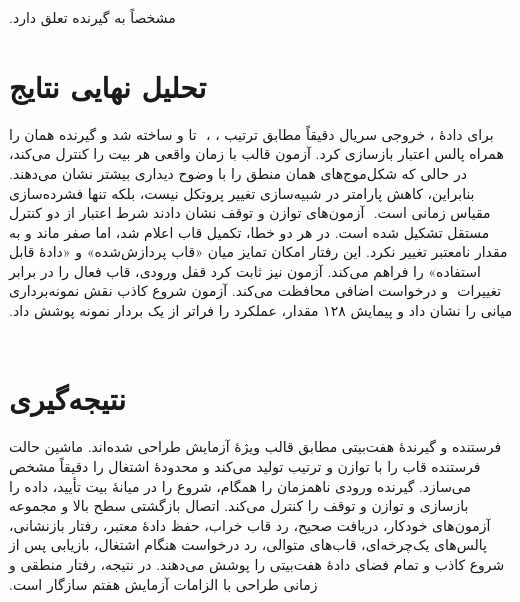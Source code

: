 ‫مشخصاً به گیرنده تعلق دارد.
‫
‫
‫\section{تحلیل نهایی نتایج}
‫
‫برای دادهٔ ، خروجی سریال دقیقاً مطابق ترتیب ، ،
‫ تا  و  ساخته شد و گیرنده همان  را همراه پالس
‫اعتبار بازسازی کرد. آزمون قالب با  زمان واقعی هر بیت را کنترل می‌کند،
‫در حالی که شکل‌موج‌های  همان منطق را با وضوح دیداری بیشتر نشان
‫می‌دهند. بنابراین، کاهش پارامتر در شبیه‌سازی تغییر پروتکل نیست، بلکه تنها فشرده‌سازی مقیاس
‫زمانی است.
‫
‫آزمون‌های توازن و توقف نشان دادند شرط اعتبار از دو کنترل مستقل تشکیل شده است. در هر دو
‫خطا، تکمیل قاب اعلام شد، اما  صفر ماند و  به مقدار
‫نامعتبر تغییر نکرد. این رفتار امکان تمایز میان «قاب پردازش‌شده» و «دادهٔ قابل استفاده» را
‫فراهم می‌کند. آزمون  نیز ثابت کرد قفل ورودی، قاب فعال را در برابر تغییرات
‫ و درخواست اضافی محافظت می‌کند. آزمون شروع کاذب نقش نمونه‌برداری میانی را
‫نشان داد و پیمایش ۱۲۸ مقدار، عملکرد را فراتر از یک بردار نمونه پوشش داد.
‫
‫
‫\section{نتیجه‌گیری}
‫
‫فرستنده و گیرندهٔ  هفت‌بیتی مطابق قالب ویژهٔ آزمایش طراحی شده‌اند. ماشین حالت
‫فرستنده قاب را با توازن  و ترتیب  تولید می‌کند و 
‫محدودهٔ اشتغال را دقیقاً مشخص می‌سازد. گیرنده ورودی ناهمزمان را همگام، شروع را در میانهٔ
‫بیت تأیید، داده را بازسازی و توازن و توقف را کنترل می‌کند. اتصال بازگشتی سطح بالا و مجموعه
‫آزمون‌های خودکار، دریافت صحیح، رد قاب خراب، حفظ دادهٔ معتبر، رفتار بازنشانی، پالس‌های
‫یک‌چرخه‌ای، قاب‌های متوالی، رد درخواست هنگام اشتغال، بازیابی پس از شروع کاذب و تمام فضای
‫دادهٔ هفت‌بیتی را پوشش می‌دهند. در نتیجه، رفتار منطقی و زمانی طراحی با الزامات آزمایش هفتم
‫سازگار است.
‫